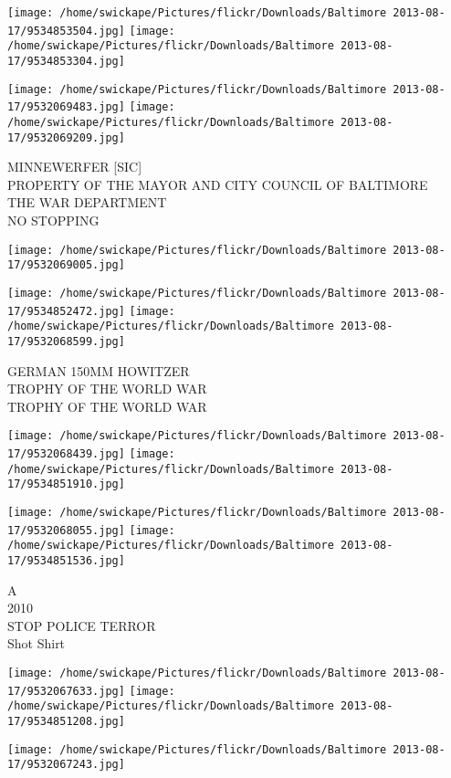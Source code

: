 \documentclass[10pt,letterpaper]{article}
\begin{document}
\texttt{[image: /home/swickape/Pictures/flickr/Downloads/Baltimore 2013-08-17/9534853504.jpg]}
\texttt{[image: /home/swickape/Pictures/flickr/Downloads/Baltimore 2013-08-17/9534853304.jpg]}

\texttt{[image: /home/swickape/Pictures/flickr/Downloads/Baltimore 2013-08-17/9532069483.jpg]}
\texttt{[image: /home/swickape/Pictures/flickr/Downloads/Baltimore 2013-08-17/9532069209.jpg]}

MINNEWERFER {[}SIC{]}\\
PROPERTY OF THE MAYOR AND CITY COUNCIL OF BALTIMORE\\
THE WAR DEPARTMENT\\
NO STOPPING
\pagebreak

\texttt{[image: /home/swickape/Pictures/flickr/Downloads/Baltimore 2013-08-17/9532069005.jpg]}

\vspace{0.25in}
\texttt{[image: /home/swickape/Pictures/flickr/Downloads/Baltimore 2013-08-17/9534852472.jpg]}
\texttt{[image: /home/swickape/Pictures/flickr/Downloads/Baltimore 2013-08-17/9532068599.jpg]}

GERMAN 150MM HOWITZER\\
TROPHY OF THE WORLD WAR\\
TROPHY OF THE WORLD WAR
\pagebreak

\texttt{[image: /home/swickape/Pictures/flickr/Downloads/Baltimore 2013-08-17/9532068439.jpg]}
\texttt{[image: /home/swickape/Pictures/flickr/Downloads/Baltimore 2013-08-17/9534851910.jpg]}

\texttt{[image: /home/swickape/Pictures/flickr/Downloads/Baltimore 2013-08-17/9532068055.jpg]}
\texttt{[image: /home/swickape/Pictures/flickr/Downloads/Baltimore 2013-08-17/9534851536.jpg]}

A\\
2010\\
STOP POLICE TERROR\\
Shot Shirt
\pagebreak

\texttt{[image: /home/swickape/Pictures/flickr/Downloads/Baltimore 2013-08-17/9532067633.jpg]}
\texttt{[image: /home/swickape/Pictures/flickr/Downloads/Baltimore 2013-08-17/9534851208.jpg]}

\texttt{[image: /home/swickape/Pictures/flickr/Downloads/Baltimore 2013-08-17/9532067243.jpg]}
\end{document}
